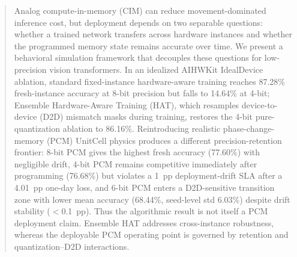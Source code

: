 \begin{abstract}
Analog compute-in-memory (CIM) can reduce movement-dominated inference cost, but deployment depends on two separable questions: whether a trained network transfers across hardware instances and whether the programmed memory state remains accurate over time. We present a behavioral simulation framework that decouples these questions for low-precision vision transformers. In an idealized AIHWKit IdealDevice ablation, standard fixed-instance hardware-aware training reaches 87.28\% fresh-instance accuracy at 8-bit precision but falls to 14.64\% at 4-bit; Ensemble Hardware-Aware Training (HAT), which resamples device-to-device (D2D) mismatch masks during training, restores the 4-bit pure-quantization ablation to 86.16\%. Reintroducing realistic phase-change-memory (PCM) UnitCell physics produces a different precision-retention frontier: 8-bit PCM gives the highest fresh accuracy (77.60\%) with negligible drift, 4-bit PCM remains competitive immediately after programming (76.68\%) but violates a 1~pp deployment-drift SLA after a 4.01~pp one-day loss, and 6-bit PCM enters a D2D-sensitive transition zone with lower mean accuracy (68.44\%, seed-level std 6.03\%) despite drift stability ($<$0.1~pp). Thus the algorithmic result is not itself a PCM deployment claim. Ensemble HAT addresses cross-instance robustness, whereas the deployable PCM operating point is governed by retention and quantization--D2D interactions.
\end{abstract}
